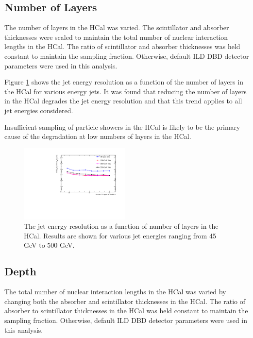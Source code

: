 \documentclass[final,3p,times,twocolumn]{elsarticle}
\begin{document}
\subsection{Number of Layers}
The number of layers in the HCal was varied.  The scintillator and absorber thicknesses were scaled to maintain the total number of nuclear interaction lengths in the HCal.  The ratio of scintillator and absorber thicknesses was held constant to maintain the sampling fraction.  Otherwise, default ILD DBD detector parameters were used in this analysis.

Figure \ref{HCalLayers} shows the jet energy resolution as a function of the number of layers in the HCal for various energy jets.  It was found that reducing the number of layers in the HCal degrades the jet energy resolution and that this trend applies to all jet energies considered.  

Insufficient sampling of particle showers in the HCal is likely to be the primary cause of the degradation at low numbers of layers in the HCal.

\begin{figure}[!h]
  \begin{center}
     \includegraphics[width=0.49\textwidth]{6_HCalParamScan/JER_vs_NumberOfLayersInTheHCal.pdf}
     \caption{The jet energy resolution as a function of number of layers in the HCal.  Results are shown for various jet energies ranging from 45 GeV to 500 GeV.\label{HCalLayers}}
  \end{center}
\end{figure}


\subsection{Depth}
The total number of nuclear interaction lengths in the HCal was varied by changing both the absorber and scintillator thicknesses in the HCal.  The ratio of absorber to scintillator thicknesses in the HCal was held constant to maintain the sampling fraction.  Otherwise, default ILD DBD detector parameters were used in this analysis.
\end{document}
